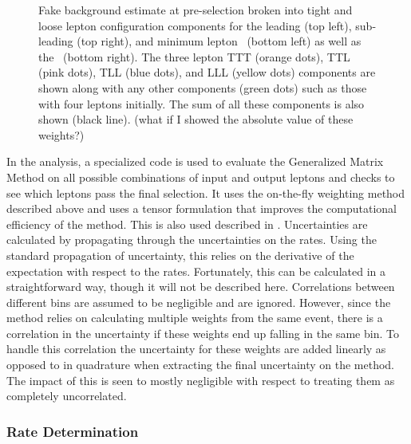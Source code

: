 \begin{figure}
\caption{Fake background estimate at pre-selection broken
into tight and loose lepton configuration components for the 
leading (top left), sub-leading (top right), and minimum lepton \pt~(bottom left)
as well as the \met~(bottom right). The three lepton TTT (orange dots),
TTL (pink dots), TLL (blue dots), and LLL (yellow dots) components
are shown along with any other components (green dots) such as those
with four leptons initially.  The sum of all these components is also
shown (black line). (what if I showed the absolute value of these weights?)}
\label{fig:mxm_components}
\end{figure}


In the analysis, a specialized code is used to evaluate the 
Generalized Matrix Method
on all possible combinations of input and output leptons and checks
to see which leptons pass the final selection. 
It uses the on-the-fly
weighting method described above and uses a tensor
formulation that improves the computational efficiency of the method.
This is also used described in \cite{Gillam:2014xua}.
Uncertainties are calculated by propagating through 
the uncertainties on the rates. 
Using the standard propagation of uncertainty, this relies
on the derivative of the expectation with respect to the rates.
Fortunately, this can be calculated in a straightforward way,
though it will not be described here.
Correlations between different bins are assumed to be negligible and 
are ignored.  However, since the method relies on calculating multiple
weights from the same event, there is a correlation in the uncertainty
if these weights end up falling in the same bin. To handle this 
correlation the uncertainty for these weights are added linearly 
as opposed to in quadrature when extracting the final uncertainty 
on the method. The impact of this is seen to mostly negligible
with respect to treating them as completely uncorrelated.

\subsubsection{Rate Determination}

